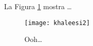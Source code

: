 \documentclass{article}
\begin{document}
La Figura \ref{fig:khal} mostra \dots

\begin{figure}
    \centering
    \texttt{[image: khaleesi2]}
    \caption{Ooh\dots} %
    \label{fig:khal}
\end{figure}
\end{document}
